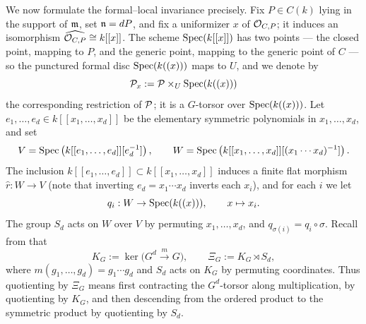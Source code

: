 We now formulate the formal--local invariance precisely. Fix $P \in C(k)$ lying in the support of $\mathfrak{m}$, set $\mathfrak{n} = dP$,
and fix a uniformizer $x$ of $\mathcal{O}_{C,P}$; it induces an isomorphism $\widehat{\mathcal{O}_{C,P}} \cong k[[x]]$.
The scheme $\operatorname{Spec}(k[[x]])$ has two points --- the closed point, mapping to $P$, and the generic point, mapping to the generic
point of $C$ --- so the punctured formal disc $\operatorname{Spec}(k((x)))$ maps to $U$, and we denote by
$$\mathcal{P}_x := \mathcal{P} \times_U \operatorname{Spec}(k((x)))$$
the corresponding restriction of $\mathcal{P}$; it is a $G$-torsor over $\operatorname{Spec}(k((x)))$.
Let $e_1, \dots, e_d \in k[[x_1, \dots, x_d]]$ be the elementary symmetric polynomials in $x_1, \dots, x_d$, and set
$$ V = \operatorname{Spec}\left(k[[e_1, \dots, e_d]][e_d^{-1}]\right), \qquad W = \operatorname{Spec}\left(k[[x_1, \dots, x_d]][(x_1 \cdots x_d)^{-1}]\right).$$
The inclusion $k[[e_1, \dots, e_d]] \subset k[[x_1, \dots, x_d]]$ induces a finite flat morphism $\hat{r}: W \to V$
(note that inverting $e_d = x_1 \cdots x_d$ inverts each $x_i$), and for each $i$ we let
$$ q_i : W \to \operatorname{Spec}(k((x))), \qquad x \mapsto x_i.$$
The group $S_d$ acts on $W$ over $V$ by permuting $x_1, \dots, x_d$, and $q_{\sigma(i)} = q_i \circ \sigma$.
Recall from  that
\[
K_G:=\ker\bigl(G^d\xrightarrow{\,m\,}G\bigr),
\qquad
\Xi_G:=K_G\rtimes S_d,
\]
where $m(g_1,\dots,g_d)=g_1\cdots g_d$ and $S_d$ acts on $K_G$ by
permuting coordinates. Thus quotienting by $\Xi_G$ means first contracting
the $G^d$-torsor along multiplication, by quotienting by $K_G$, and then
descending from the ordered product to the symmetric product by quotienting
by $S_d$.

